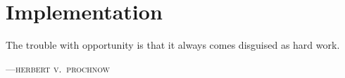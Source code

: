 
\chapter{Implementation}
\epigraph{The trouble with opportunity is that it always comes disguised as hard work.}%
{\textsc{---herbert v.\ prochnow}}


%
%
%

